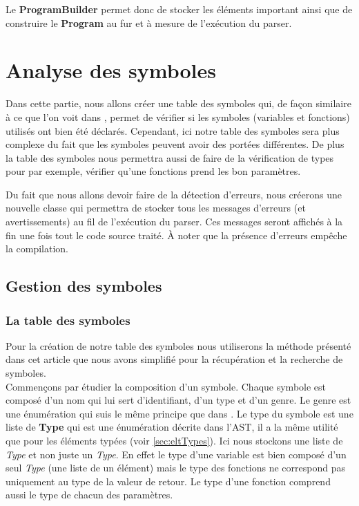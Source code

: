 \documentclass[a4paper]{article}%
\begin{document}
Le \textbf{ProgramBuilder} permet donc de stocker les éléments important ainsi
que de construire le \textbf{Program} au fur et à mesure de l'exécution du
\gls{parser}.


\section{Analyse des symboles}

Dans cette partie, nous allons créer une table des symboles qui, de façon
similaire à ce que l'on voit dans \cite{compilerFlexBison}, permet de vérifier
si les symboles (variables et fonctions) utilisés ont bien été déclarés.
Cependant, ici notre table des symboles sera plus complexe du fait que les
symboles peuvent avoir des portées différentes. De plus la table des symboles
nous permettra aussi de faire de la vérification de types pour par exemple,
vérifier qu'une fonctions prend les bon paramètres.

Du fait que nous allons devoir faire de la détection d'erreurs, nous créerons
une nouvelle classe qui permettra de stocker tous les messages d'erreurs (et
avertissements) au fil de l'exécution du \gls{parser}. Ces messages seront affichés à
la fin une fois tout le code source traité. À noter que la présence d'erreurs
empêche la compilation.

\subsection{Gestion des symboles}

\subsubsection*{La table des symboles}

Pour la création de notre table des symboles nous utiliserons la méthode
présenté dans cet article \cite{power2000symbol} que nous avons simplifié pour
la récupération et la recherche de symboles.\\

Commençons par étudier la composition d'un symbole. Chaque symbole est composé
d'un nom qui lui sert d'identifiant, d'un type et d'un genre. Le genre est une
énumération qui suis le même principe que dans \cite{power2000symbol}. Le type
du symbole est une liste de \textbf{Type} qui est une énumération décrite dans
l'AST, il a la même utilité que pour les éléments typées (voir
\ref{sec:eltTypes}). Ici nous stockons une liste de \textit{Type} et non
juste un \textit{Type}. En effet le type d'une variable est bien composé d'un
seul \textit{Type} (une liste de un élément) mais le type des fonctions ne
correspond pas uniquement au type de la valeur de retour. Le type d'une fonction
comprend aussi le type de chacun des paramètres.
\end{document}
